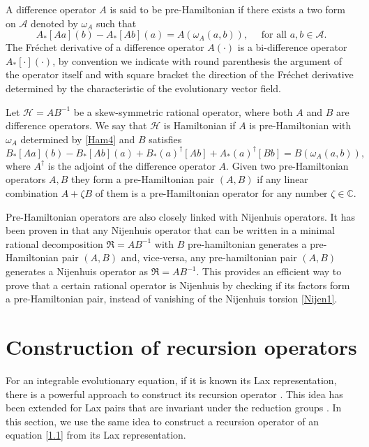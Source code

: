 \documentclass[fleqn,11pt,twoside]{article}
\newcommand\cH{{\mathcal H}}
\newcommand\cA{{\mathcal A}}
\theoremstyle{definition}
\begin{document}
	A difference operator $A$ is said to be pre-Hamiltonian if there exists a two form on $\cA$ denoted by $\omega_A$ such that
	\begin{equation}
		A_*[A a](b) - A_*[A b](a) = A (\omega_A (a,b)), \quad \mbox{ for all $a, b \in \cA$.}
		\label{Ham4}
	\end{equation}
The Fr\'echet derivative of a difference operator $A(\cdot)$ is a bi-difference
operator $A_*[\cdot](\cdot)$, by convention we indicate with round parenthesis
the argument of the operator itself and with square bracket the direction of the Fr\'echet derivative determined by the characteristic of the evolutionary vector field.

Let $\cH=A B^{-1}$ be a skew-symmetric rational operator, where both $A$ and $B$ are difference operators. We say that $\cH$ is Hamiltonian if
$A$ is pre-Hamiltonian with $\omega_A$ determined by \eqref{Ham4} and $B$ satisfies
	\begin{equation}
		B_*[A a](b)-B_*[A b](a)+B_*(a)^\dagger[A b]+A_*(a)^\dagger[B b]
= B (\omega_A(a,b)) ,
		\label{Ham5}
	\end{equation}
where $A^\dagger$ is the adjoint of the difference operator $A$.
Given two pre-Hamiltonian operators $A,B$ they form a pre-Hamiltonian pair
$(A,B)$ if any linear combination $A + \zeta B$ of them is a pre-Hamiltonian
operator for any number $\zeta \in \mathbb{C}$.

Pre-Hamiltonian operators are also closely linked with Nijenhuis
operators.
	It has been proven in \cite{4, 41} that any Nijenhuis operator that can be
written in a minimal rational decomposition $\mathfrak{R} = A B^{-1}$ with $B$
pre-hamiltonian generates a pre-Hamiltonian pair $(A,B)$ and, vice-versa, any
pre-hamiltonian pair $(A,B)$ generates a Nijenhuis operator as $\mathfrak{R} = A B^{-1}$.
This provides an efficient way to prove that a certain rational operator is
Nijenhuis by checking if its factors form a pre-Hamiltonian pair, instead of vanishing of
the Nijenhuis torsion \eqref{Nijen1}.

\section{Construction of recursion operators}\label{Sec2}
For an integrable evolutionary equation, if it is known its Lax representation, there is a powerful approach to construct its recursion operator \cite{48}.
This idea has been extended for Lax
pairs that are invariant under the reduction groups \cite{7,1}.
In this section,  we use the same idea to construct a recursion operator
of an equation \eqref{1.1} from its Lax representation.
\end{document}
